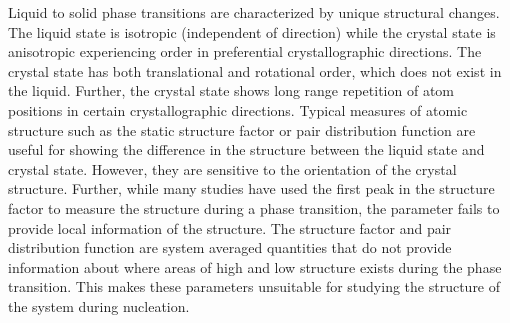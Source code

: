 Liquid to solid phase transitions are characterized by unique structural changes.  The liquid state is isotropic (independent of direction) while the crystal state is anisotropic experiencing order in preferential crystallographic directions.  The crystal state has both translational and rotational order, which does not exist in the liquid.  Further, the crystal state shows long range repetition of atom positions in certain crystallographic directions.  Typical measures of atomic structure such as the static structure factor or pair distribution function are useful for showing the difference in the structure between the liquid state and crystal state.  However, they are sensitive to the orientation of the crystal structure.  Further, while many studies have used the first peak in the structure factor to measure the structure during a phase transition, the parameter fails to provide local information of the structure.  The structure factor and pair distribution function are system averaged quantities that do not provide information about where areas of high and low structure exists during the phase transition.  This makes these parameters unsuitable for studying the structure of the system during nucleation.

